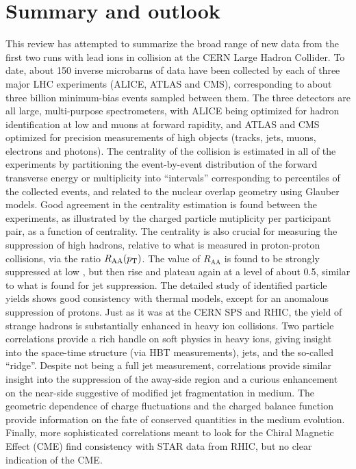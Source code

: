 \section{Summary and outlook}
\label{secall:summary}
This review has attempted to summarize the broad range of new data from the first two 
runs with lead ions in collision at the CERN Large Hadron Collider.
To date, about 150 inverse microbarns of data have been collected by each of 
three major LHC experiments (ALICE, ATLAS and CMS), corresponding to about three billion
minimum-bias events sampled between them.  
The three detectors are all large, multi-purpose spectrometers, with ALICE being optimized
for hadron identification at low \pT and muons at forward rapidity,
and ATLAS and CMS optimized for precision measurements 
of high \pT objects (tracks, jets, muons, electrons and photons).
The centrality of the collision is estimated in all of the experiments by partitioning
the event-by-event distribution of the forward transverse energy or multiplicity into
``intervals'' corresponding to percentiles of the collected events, and related to
the nuclear overlap geometry using Glauber models.
Good agreement in the centrality estimation is found between the experiments, as illustrated
by the charged particle mutiplicity per participant pair, as a function of centrality.
The centrality is also crucial for measuring the suppression of high \pT hadrons, relative
to what is measured in proton-proton collisions, via the ratio $R_{\mathrm{AA}}( \mbox{$p_{\mathrm{T}}$} )$.
The value of $R_{\mathrm{AA}}$ is found to be strongly suppressed at low \pT, but then rise
and plateau again at a level of about 0.5, similar to what is found for jet suppression.
The detailed study of identified particle yields shows good consistency with thermal models,
except for an anomalous suppression of protons.
Just as it was at the CERN SPS and RHIC, the yield of strange hadrons is substantially
enhanced in heavy ion collisions.
Two particle correlations provide a rich handle on soft physics in heavy ions, giving
insight into the space-time structure (via HBT measurements), jets, and the so-called
``ridge''.  Despite not being a full jet measurement, correlations provide similar insight
into the suppression of the away-side region and a curious enhancement on the near-side
suggestive of modified jet fragmentation in medium.
The geometric dependence of charge fluctuations and the charged balance function provide
information on the fate of conserved quantities in the medium evolution.
Finally, more sophisticated correlations meant to look for the Chiral Magnetic Effect (CME)
find consistency with STAR data from RHIC, but no clear indication of the CME.

